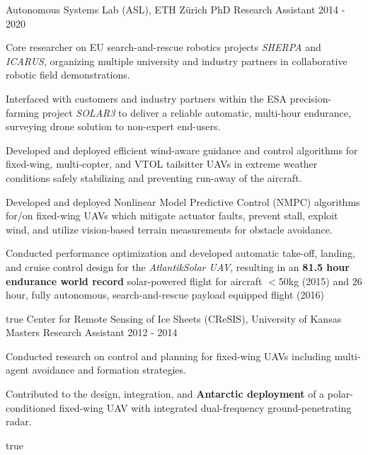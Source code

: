 \begin{cventries}
%
\cvexpentry
  	{Autonomous Systems Lab (ASL), ETH Z\"{u}rich} %
  	{PhD Research Assistant} %
    {} %
    {2014 - 2020} %
    {
      \begin{cvitems} %
      	\item Core researcher on EU search-and-rescue robotics projects \emph{SHERPA} and \emph{ICARUS}, organizing multiple university and industry partners in collaborative robotic field demonstrations.
      	\item Interfaced with customers and industry partners within the ESA precision-farming project \emph{SOLAR3} to deliver a reliable automatic, multi-hour endurance, surveying drone solution to non-expert end-users.
      	\item Developed and deployed efficient wind-aware guidance and control algorithms for fixed-wing, multi-copter, and VTOL tailsitter UAVs in extreme weather conditions safely stabilizing and preventing run-away of the aircraft.
      	\item Developed and deployed Nonlinear Model Predictive Control (NMPC) algorithms for/on fixed-wing UAVs which mitigate actuator faults, prevent stall, exploit wind, and utilize vision-based terrain measurements for obstacle avoidance.
		\item Conducted performance optimization and developed automatic take-off, landing, and cruise control design for the \emph{AtlantikSolar UAV}, resulting in an \textbf{81.5 hour endurance world record} solar-powered flight for aircraft $<$50kg (2015)  and 26 hour, fully autonomous, search-and-rescue payload equipped flight (2016) 
      \end{cvitems}
    } %
    {} %
    {true}
    {}
%   
\cvexpentry
  	{Center for Remote Sensing of Ice Sheets (CReSIS), University of Kansas} %
  	{Masters Research Assistant} %
    {} %
    {2012 - 2014} %
    {
      \begin{cvitems} %
      	\item Conducted research on control and planning for fixed-wing UAVs including multi-agent avoidance and formation strategies.
      	\item Contributed to the design, integration, and \textbf{Antarctic deployment} of a polar-conditioned fixed-wing UAV with integrated dual-frequency ground-penetrating radar.
      \end{cvitems}
    } %
    {} %
    {true}
    {}
\end{cventries}
